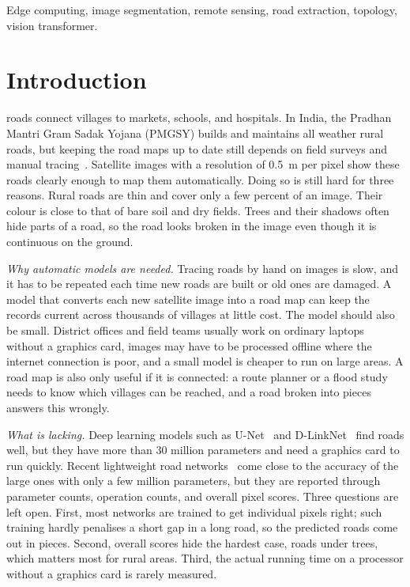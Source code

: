 \documentclass{ieeeaccess}
\begin{document}
\begin{keywords}
Edge computing, image segmentation, remote sensing, road extraction, topology, vision transformer.
\end{keywords}

\titlepgskip=-15pt

\maketitle

\section{Introduction}
\label{sec:introduction}

 roads connect villages to markets, schools, and hospitals. In India, the Pradhan Mantri Gram Sadak Yojana (PMGSY) builds and maintains all weather rural roads, but keeping the road maps up to date still depends on field surveys and manual tracing~\cite{pmgsy}. Satellite images with a resolution of 0.5~m per pixel show these roads clearly enough to map them automatically. Doing so is still hard for three reasons. Rural roads are thin and cover only a few percent of an image. Their colour is close to that of bare soil and dry fields. Trees and their shadows often hide parts of a road, so the road looks broken in the image even though it is continuous on the ground.

\emph{Why automatic models are needed.} Tracing roads by hand on images is slow, and it has to be repeated each time new roads are built or old ones are damaged. A model that converts each new satellite image into a road map can keep the records current across thousands of villages at little cost. The model should also be small. District offices and field teams usually work on ordinary laptops without a graphics card, images may have to be processed offline where the internet connection is poor, and a small model is cheaper to run on large areas. A road map is also only useful if it is connected: a route planner or a flood study needs to know which villages can be reached, and a road broken into pieces answers this wrongly.

\emph{What is lacking.} Deep learning models such as U-Net~\cite{ronneberger2015unet} and D-LinkNet~\cite{zhou2018dlinknet} find roads well, but they have more than 30 million parameters and need a graphics card to run quickly. Recent lightweight road networks~\cite{cui2025hplnet} come close to the accuracy of the large ones with only a few million parameters, but they are reported through parameter counts, operation counts, and overall pixel scores. Three questions are left open. First, most networks are trained to get individual pixels right; such training hardly penalises a short gap in a long road, so the predicted roads come out in pieces. Second, overall scores hide the hardest case, roads under trees, which matters most for rural areas. Third, the actual running time on a processor without a graphics card is rarely measured.
\end{document}
